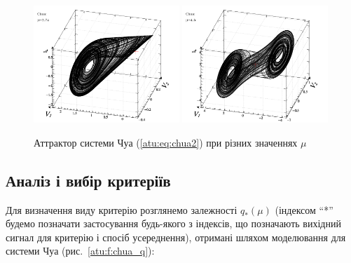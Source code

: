 \begin{figure}[htb!]
\centerline{
  \includegraphics[width=0.49\textwidth]{p/cha/chua/chua_1-p_xyz_mu=2x74.png}
  \includegraphics[width=0.49\textwidth]{p/cha/chua/chua_1-p_xyz_mu=4x50.png}
}
\caption{Аттрактор системи Чуа (\ref{atu:eq:chua2}) при різних значеннях $ \mu $}
\label{atu:f:chua_phase}
\end{figure}



\subsection{Аналіз і вибір критеріїв}%


Для визначення виду критерію розглянемо залежності
$q_{*}(\mu)$ (індексом ``*'' будемо позначати застосування будь-якого
з індексів, що позначають вихідний сигнал для критерію і спосіб
усереднення), отримані шляхом моделювання для системи Чуа (рис.~\ref{atu:f:chua_q}):

